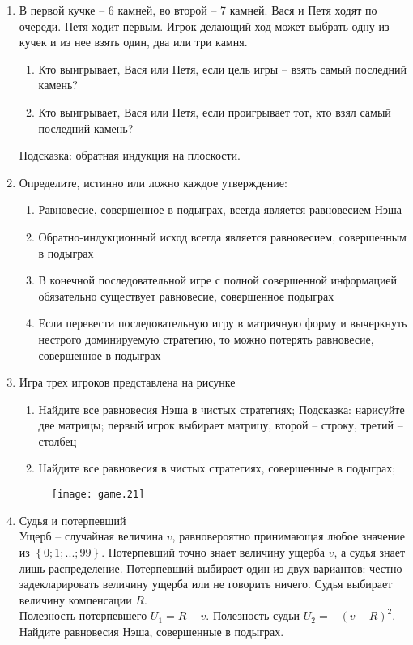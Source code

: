 \documentclass[pdftex,12pt,a4paper]{article}
\begin{document}
\begin{enumerate}
\item 
В первой кучке – 6 камней, во второй – 7 камней. Вася и Петя ходят по очереди. Петя ходит первым.  Игрок делающий ход может выбрать одну из кучек и из нее взять один, два или три камня.
\begin{enumerate}
\item Кто выигрывает, Вася или Петя, если цель игры – взять самый последний камень?
\item Кто выигрывает, Вася или Петя, если проигрывает тот, кто взял самый последний камень?
\end{enumerate}
Подсказка: обратная индукция на плоскости.

\item 
Определите, истинно или ложно каждое утверждение:
\begin{enumerate}
\item Равновесие, совершенное в подыграх, всегда является равновесием Нэша
\item Обратно-индукционный исход всегда является равновесием, совершенным в подыграх
\item В конечной последовательной игре с полной совершенной информацией обязательно существует равновесие, совершенное подыграх
\item Если перевести последовательную игру в матричную форму и вычеркнуть нестрого доминируемую стратегию, то можно потерять равновесие, совершенное в подыграх
\end{enumerate}

\item 
Игра трех игроков представлена на рисунке 
\begin{enumerate}
\item Найдите все равновесия Нэша в чистых стратегиях; Подсказка: нарисуйте две матрицы; первый игрок выбирает матрицу, второй – строку, третий – столбец
\item Найдите все равновесия в чистых стратегиях, совершенные в подыграх;
\end{enumerate}
\begin{figure}[!htbp]
    \texttt{[image: game.21]}
\end{figure}

\item Судья и потерпевший\\
Ущерб – случайная величина $v$, равновероятно принимающая любое значение из $\left\{ {0;1;...;99} \right\}$. Потерпевший точно знает величину ущерба $v$, а судья знает лишь распределение. Потерпевший выбирает один из двух вариантов: честно задекларировать величину ущерба или не говорить ничего. Судья выбирает величину компенсации $R$.\\
Полезность потерпевшего $U_1  = R - v$. Полезность судьи $U_2  =  - \left( {v - R} \right)^2$.\\
Найдите равновесия Нэша, совершенные в подыграх.


\end{enumerate}
\end{document}
